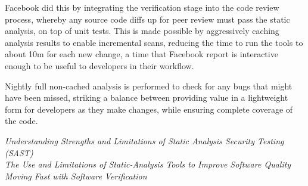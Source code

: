 \documentclass[11pt]{article}
\begin{document}
Facebook did this by integrating the verification stage into the code review
process, whereby any source code diffs up for peer review must pass the static
analysis, on top of unit tests. This is made possible by aggressively caching
analysis results to enable incremental scans, reducing the time to run the tools
to about 10m for each new change, a time that Facebook report is interactive
enough to be useful to developers in their workflow.

Nightly full non-cached analysis is performed to check for any bugs that might
have been missed, striking a balance between providing value in a lightweight
form for developers as they make changes, while ensuring complete coverage of
the code.


\begin{thebibliography}{99}

 \emph{Understanding Strengths and Limitations of Static
  Analysis Security Testing (SAST)} \\
 \emph{The Use and Limitations of Static-Analysis Tools to
  Improve Software Quality} \\
 \emph{Moving Fast with Software Verification} \\
  \end{thebibliography}
\end{document}
